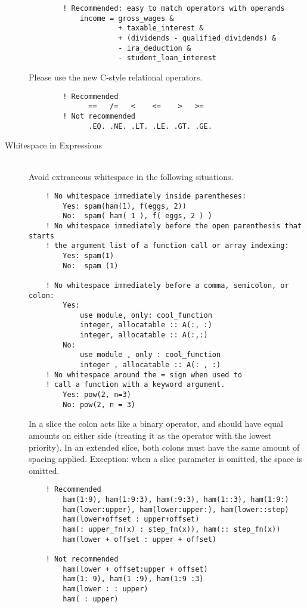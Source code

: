 \documentclass[a4paper,notitlepage,dvipsnames]{scrreprt}
\newcommand\headitem[1]{\needspace{1.5\baselineskip}\item[{\boldmath #1 \nopagebreak}] \hfill \\ \nopagebreak}
\begin{document}
\begin{description}
\begin{lstlisting}
        ! Recommended: easy to match operators with operands
            income = gross_wages &
                     + taxable_interest &
                     + (dividends - qualified_dividends) &
                     - ira_deduction &
                     - student_loan_interest
        \end{lstlisting}

        Please use the new C-style relational operators.
        \begin{lstlisting}
        ! Recommended
              ==   /=   <    <=    >   >=
        ! Not recommended
              .EQ. .NE. .LT. .LE. .GT. .GE.
        \end{lstlisting}

    \headitem{Whitespace in Expressions}
        Avoid extraneous whitespace in the following situations.

        \begin{lstlisting}
    ! No whitespace immediately inside parentheses:
        Yes: spam(ham(1), f(eggs, 2))
        No:  spam( ham( 1 ), f( eggs, 2 ) )
    ! No whitespace immediately before the open parenthesis that starts
    ! the argument list of a function call or array indexing:
        Yes: spam(1)
        No:  spam (1)

    ! No whitespace immediately before a comma, semicolon, or colon:
        Yes:
            use module, only: cool_function
            integer, allocatable :: A(:, :)
            integer, allocatable :: A(:,:)
        No:
            use module , only : cool_function
            integer , allocatable :: A(: , :)
    ! No whitespace around the = sign when used to
    ! call a function with a keyword argument.
        Yes: pow(2, n=3)
        No: pow(2, n = 3)
        \end{lstlisting}
        In a slice the colon acts like a binary operator,
        and should have equal amounts on either side
        (treating it as the operator with the lowest priority).
        In an extended slice, both colons must have the same amount
        of spacing applied.
        Exception: when a slice parameter is omitted, the space is omitted.
        \begin{lstlisting}
    ! Recommended
        ham(1:9), ham(1:9:3), ham(:9:3), ham(1::3), ham(1:9:)
        ham(lower:upper), ham(lower:upper:), ham(lower::step)
        ham(lower+offset : upper+offset)
        ham(: upper_fn(x) : step_fn(x)), ham(:: step_fn(x))
        ham(lower + offset : upper + offset)

    ! Not recommended
        ham(lower + offset:upper + offset)
        ham(1: 9), ham(1 :9), ham(1:9 :3)
        ham(lower : : upper)
        ham( : upper)
        \end{lstlisting}


\end{description}
\end{document}
